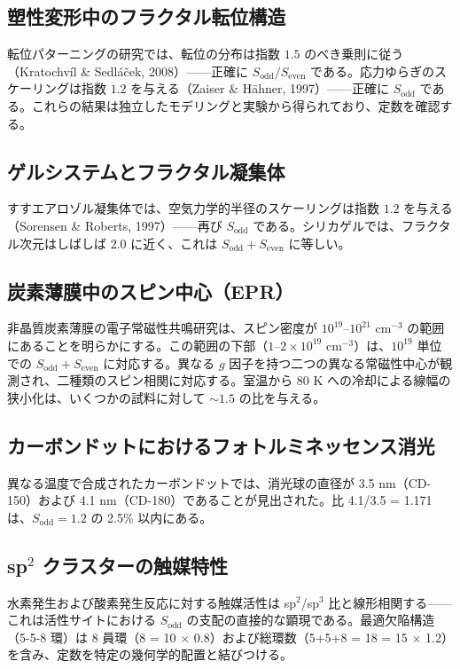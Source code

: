 \documentclass[11pt,a4paper]{article}
\begin{document}
	\subsection{塑性変形中のフラクタル転位構造}
	転位パターニングの研究では、転位の分布は指数 \(1.5\) のべき乗則に従う（Kratochv\'il \& Sedl\'a\v{c}ek, 2008）——正確に \(S_{\text{odd}}/S_{\text{even}}\) である。応力ゆらぎのスケーリングは指数 \(1.2\) を与える（Zaiser \& H\"ahner, 1997）——正確に \(S_{\text{odd}}\) である。これらの結果は独立したモデリングと実験から得られており、定数を確認する。
	
	\subsection{ゲルシステムとフラクタル凝集体}
	すすエアロゾル凝集体では、空気力学的半径のスケーリングは指数 \(1.2\) を与える（Sorensen \& Roberts, 1997）——再び \(S_{\text{odd}}\) である。シリカゲルでは、フラクタル次元はしばしば 2.0 に近く、これは \(S_{\text{odd}}+S_{\text{even}}\) に等しい。
	
	\subsection{炭素薄膜中のスピン中心（EPR）}
	非晶質炭素薄膜の電子常磁性共鳴研究は、スピン密度が \(10^{19}\)--\(10^{21}\) cm\({}^{-3}\) の範囲にあることを明らかにする。この範囲の下部（\(1\)--\(2\times10^{19}\) cm\({}^{-3}\)）は、\(10^{19}\) 単位での \(S_{\text{odd}}+S_{\text{even}}\) に対応する。異なる \(g\) 因子を持つ二つの異なる常磁性中心が観測され、二種類のスピン相関に対応する。室温から 80 K への冷却による線幅の狭小化は、いくつかの試料に対して \(\sim 1.5\) の比を与える。
	
	\subsection{カーボンドットにおけるフォトルミネッセンス消光}
	異なる温度で合成されたカーボンドットでは、消光球の直径が 3.5 nm（CD-150）および 4.1 nm（CD-180）であることが見出された。比 4.1/3.5 = 1.171 は、\(S_{\text{odd}}=1.2\) の 2.5\% 以内にある。
	
	\subsection{sp\({}^2\) クラスターの触媒特性}
	水素発生および酸素発生反応に対する触媒活性は sp\({}^2\)/sp\({}^3\) 比と線形相関する——これは活性サイトにおける \(S_{\text{odd}}\) の支配の直接的な顕現である。最適欠陥構造（5-5-8 環）は 8 員環（8 = 10 \(\times\) 0.8）および総環数（5+5+8 = 18 = 15 \(\times\) 1.2）を含み、定数を特定の幾何学的配置と結びつける。
	
\end{document}
